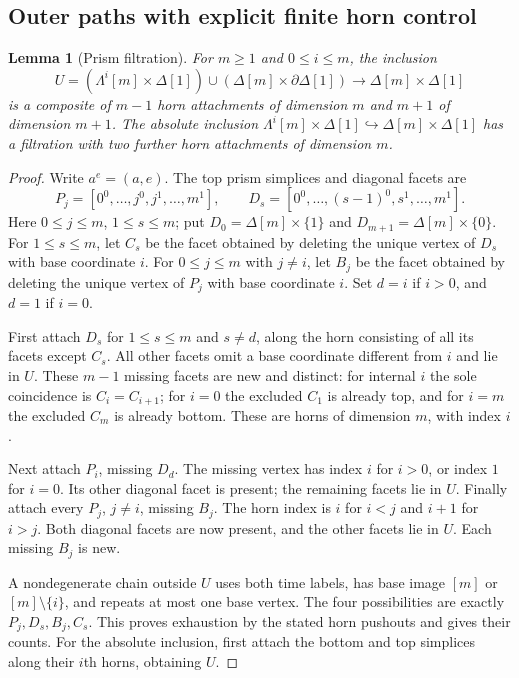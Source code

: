 \documentclass[12pt]{amsart}
\newtheorem{lem}[thm]{Lemma}
\theoremstyle{definition}
\theoremstyle{remark}
\numberwithin{equation}{section}
\begin{document}
\subsection{Outer paths with explicit finite horn control}

\begin{lem}[Prism filtration]\label{lem:derived-prism-filtration}
For $m\ge1$ and $0\le i\le m$, the inclusion
\[
 U=(\Lambda^i[m]\times\Delta[1])
   \cup(\Delta[m]\times\partial\Delta[1])
   \longrightarrow\Delta[m]\times\Delta[1]
\]
is a composite of $m-1$ horn attachments of dimension $m$
and $m+1$ of dimension $m+1$.
The absolute inclusion
$\Lambda^i[m]\times\Delta[1]\hookrightarrow\Delta[m]\times\Delta[1]$
has a filtration with two further horn attachments of dimension $m$.
\end{lem}

\begin{proof}
Write $a^e=(a,e)$. The top prism simplices and diagonal
facets are
\[
 P_j=[0^0,\ldots,j^0,j^1,\ldots,m^1],\qquad
 D_s=[0^0,\ldots,(s-1)^0,s^1,\ldots,m^1].
\]
Here $0\le j\le m$, $1\le s\le m$; put
$D_0=\Delta[m]\times\{1\}$ and
$D_{m+1}=\Delta[m]\times\{0\}$.
For $1\le s\le m$, let $C_s$ be the facet obtained by deleting
the unique vertex of $D_s$ with base coordinate $i$.
For $0\le j\le m$ with $j\ne i$, let $B_j$ be the facet obtained
by deleting the unique vertex of $P_j$ with base coordinate $i$.
Set $d=i$ if $i>0$, and $d=1$ if $i=0$.

First attach $D_s$ for $1\le s\le m$ and $s\ne d$, along the
horn consisting of all its facets except $C_s$.
All other facets omit a base coordinate different from
$i$ and lie in $U$. These $m-1$ missing facets are new
and distinct: for internal $i$ the sole coincidence is
$C_i=C_{i+1}$; for $i=0$ the excluded $C_1$ is already
top, and for $i=m$ the excluded $C_m$ is already bottom.
These are horns of dimension $m$, with index $i$.

Next attach $P_i$, missing $D_d$. The missing vertex
has index $i$ for $i>0$, or index $1$ for $i=0$.
Its other diagonal facet is present; the remaining
facets lie in $U$.
Finally attach every $P_j$, $j\ne i$, missing $B_j$.
The horn index is $i$ for $i<j$ and $i+1$ for $i>j$.
Both diagonal facets are now present, and the other
facets lie in $U$. Each missing $B_j$ is new.

A nondegenerate chain outside $U$ uses both time labels,
has base image $[m]$ or $[m]\setminus\{i\}$, and repeats
at most one base vertex. The four possibilities are
exactly $P_j,D_s,B_j,C_s$. This proves exhaustion by the
stated horn pushouts and gives their counts.
For the absolute inclusion, first attach the bottom
and top simplices along their $i$th horns, obtaining $U$.
\end{proof}
\end{document}
